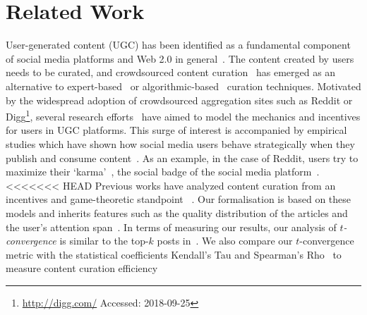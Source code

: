 \section{Related Work}
User-generated content (UGC) has been identified as a fundamental component of social media platforms and Web 2.0 in general~\cite{kaplan2010users}. The content created by users needs to be curated, and crowdsourced content curation~\cite{askalidis2013theoretical} has emerged as an alternative to expert-based~\cite{stanoevska2012content} or algorithmic-based~\cite{rader2015understanding} curation techniques. Motivated by the widespread adoption of crowdsourced aggregation sites such as Reddit or Digg\footnote{\url{http://digg.com/} Accessed: 2018-09-25}, several research efforts~\cite{das2010ranking,ghosh2011incentivizing,abbassi2014distributed} have aimed to model the mechanics and incentives for users in UGC platforms. This surge of interest is accompanied by empirical studies which have shown how
social media users behave strategically when they publish and consume content~\cite{may2014filter}. As an example, in the case of Reddit, users try to maximize their `karma'~\cite{bergstrom2011don}, the social badge of the social media platform~\cite{anderson2013steering}.
<<<<<<< HEAD
Previous works have analyzed content curation from an incentives and game-theoretic standpoint~\cite{ghosh2011incentivizing,das2010ranking,gupte2009news,may2014filter} . Our formalisation is based on  these models and inherits features such as the quality distribution of the articles and the user's attention span~\cite{askalidis2013theoretical,ghosh2011incentivizing}. In terms of measuring our results,  our analysis of \textit{$t$-convergence} is similar to the top-$k$ posts in~\cite{askalidis2013theoretical}. We also compare our $t$-convergence metric with the statistical coefficients Kendall's Tau and Spearman's Rho~\cite{xu2013comparative,yue2002power} to measure content curation efficiency  

